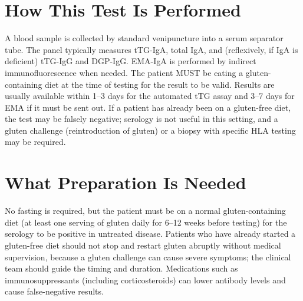 \section*{How This Test Is Performed}
A blood sample is collected by standard venipuncture into a serum separator tube. The panel typically measures tTG-IgA, total IgA, and (reflexively, if IgA is deficient) tTG-IgG and DGP-IgG. EMA-IgA is performed by indirect immunofluorescence when needed. The patient MUST be eating a gluten-containing diet at the time of testing for the result to be valid. Results are usually available within 1--3 days for the automated tTG assay and 3--7 days for EMA if it must be sent out. If a patient has already been on a gluten-free diet, the test may be falsely negative; serology is not useful in this setting, and a gluten challenge (reintroduction of gluten) or a biopsy with specific HLA testing may be required.

\section*{What Preparation Is Needed}
No fasting is required, but the patient must be on a normal gluten-containing diet (at least one serving of gluten daily for 6--12 weeks before testing) for the serology to be positive in untreated disease. Patients who have already started a gluten-free diet should not stop and restart gluten abruptly without medical supervision, because a gluten challenge can cause severe symptoms; the clinical team should guide the timing and duration. Medications such as immunosuppressants (including corticosteroids) can lower antibody levels and cause false-negative results.

